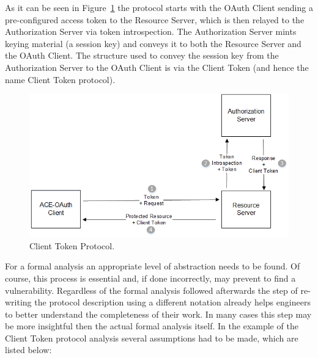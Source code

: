 \documentclass[peerreview, a4paper, 7pt]{IEEEtran}
\begin{document}
As it can be seen in Figure~\ref{client-token-figure} the protocol starts with the OAuth Client sending a pre-configured access token to the Resource Server, which is then relayed to the Authorization Server via token introspection. The Authorization Server mints keying material (a session key) and conveys it to both the Resource Server and the OAuth Client. The structure used to convey the session key from the Authorization Server to the OAuth Client is via the Client Token (and hence the name Client Token protocol). 

\begin{figure}[!htbp]
	\centering
	\includegraphics[scale=0.70]{client-token.png}
	\caption{Client Token Protocol.}
	\label{client-token-figure}
\end{figure}

For a formal analysis an appropriate level of abstraction needs to be found. Of course, this process is essential and, if done incorrectly, may prevent to find a vulnerability. Regardless of the formal analysis followed afterwards the step of re-writing the protocol description using a different notation already helps engineers to better understand the completeness of their work. In many cases this step may be more insightful then the actual formal analysis itself. In the example of the Client Token protocol analysis several assumptions had to be made, which are listed below: \\
\end{document}
